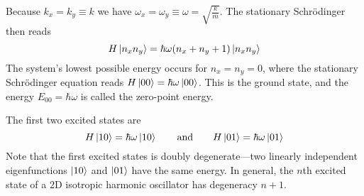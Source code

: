 \documentclass[11pt, a4paper]{article}
\newcommand{\eqtext}[1]{\qquad \text{#1} \qquad}
\newcommand{\schro}{Schr\"{o}dinger\xspace}
\begin{document}
\begin{itemize}
	Because $ k_{x} = k_{y} \equiv k $ we have $ \omega_{x} = \omega_{y} \equiv \omega = \sqrt{\frac{k}{m}}$. The stationary \schro then reads
	\begin{equation*}
		H\ket{n_{x}n_{y}} = \hbar \omega (n_{x} + n_{y} + 1)\ket{n_{x}n_{y}}
	\end{equation*}
	The system's lowest possible energy occurs for $ n_{x} = n_{y} = 0 $, where the stationary \schro equation reads $ H\ket{00} = \hbar \omega \ket{00} $. This is the ground state, and the energy $ E_{00} = \hbar \omega $ is called the zero-point energy. 
	
	The first two excited states are
	\begin{equation*}
		H\ket{10} = \hbar \omega \ket{10} \eqtext{and} H\ket{01} = \hbar \omega \ket{01}
	\end{equation*}
	Note that the first excited states is doubly degenerate---two linearly independent eigenfunctions $ \ket{10} $ and $ \ket{01} $ have the same energy. In general, the $ n $th excited state of a 2D isotropic harmonic oscillator has degeneracy $ n +1 $. 
\end{itemize}
\end{document}
